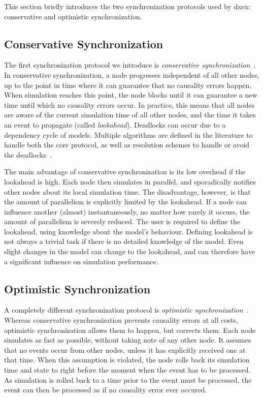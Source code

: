 This section briefly introduces the two synchronization protocols used by dxex: conservative and optimistic synchronization.

\subsection{Conservative Synchronization}
The first synchronization protocol we introduce is \textit{conservative synchronization}~\cite{FujimotoBook}.
In conservative synchronization, a node progresses independent of all other nodes, up to the point in time where it can guarantee that no causality errors happen.
When simulation reaches this point, the node blocks until it can guarantee a new time until which no causality errors occur.
In practice, this means that all nodes are aware of the current simulation time of all other nodes, and the time it takes an event to propagate (called \textit{lookahead}).
Deadlocks can occur due to a dependency cycle of models.
Multiple algorithms are defined in the literature to handle both the core protocol, as well as resolution schemes to handle or avoid the deadlocks~\cite{FujimotoBook}.

The main advantage of conservative synchronization is its low overhead if the lookahead is high.
Each node then simulates in parallel, and sporadically notifies other nodes about its local simulation time.
The disadvantage, however, is that the amount of parallelism is explicitly limited by the lookahead.
If a node can influence another (almost) instantaneously, no matter how rarely it occurs, the amount of parallelism is severely reduced.
The user is required to define the lookahead, using knowledge about the model's behaviour.
Defining lookahead is not always a trivial task if there is no detailed knowledge of the model.
Even slight changes in the model can change to the lookahead, and can therefore have a significant influence on simulation performance.

\subsection{Optimistic Synchronization}
A completely different synchronization protocol is \textit{optimistic synchronization}~\cite{TimeWarp}.
Whereas conservative synchronization prevents causality errors at all costs, optimistic synchronization allows them to happen, but corrects them.
Each node simulates as fast as possible, without taking note of any other node.
It assumes that no events occur from other nodes, unless it has explicitly received one at that time.
When this assumption is violated, the node rolls back its simulation time and state to right before the moment when the event has to be processed.
As simulation is rolled back to a time prior to the event must be processed, the event can then be processed as if no causality error ever occured.

